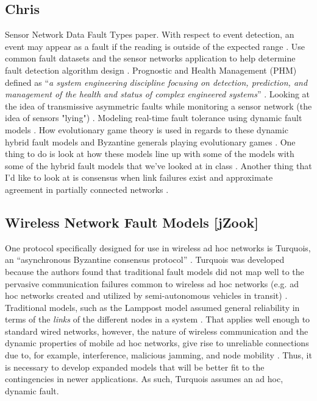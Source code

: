 \documentclass[twoside, conference]{IEEEtran}
\begin{document}
\subsection{Chris}
Sensor Network Data Fault Types paper\cite{Ni2009}.  With respect to event detection, an event may appear as a fault if the reading is outside of the expected range \cite[p. 25:5]{Ni2009}.  Use common fault datasets and the sensor networks application to help determine fault detection algorithm design \cite[p. 25:7]{Ni2009}.  Prognostic and Health Management (PHM) defined as ``\textit{a system engineering discipline focusing on detection, prediction, and management of the health and status of complex engineered systems}'' \cite[p. 1]{Ma2009}.  Looking at the idea of transmissive asymmetric faults while monitoring a sensor network (the idea of sensors "lying") \cite[p. 4]{Ma2009}.  Modeling real-time fault tolerance using dynamic fault models \cite[p. 4]{Ma2009}\cite{Ma2008}.  How evolutionary game theory is used in regards to these dynamic hybrid fault models \cite[p. 6]{Ma2009} and Byzantine generals playing evolutionary games \cite[p. 11,15]{Ma2009}.  One thing to do is look at how these models line up with some of the models with some of the hybrid fault models that we've looked at in class \cite{Azadmanesh2000}.  Another thing that I'd like to look at is consensus when link failures exist \cite{Biely2011} and approximate agreement in partially connected networks \cite{Srinivasan2007}.


\subsection{Wireless Network Fault Models [jZook]}


One protocol specifically designed for use in wireless ad hoc networks is Turquois, an ``asynchronous Byzantine consensus protocol'' \cite{Moniz2013}. Turquois was developed because the authors found that traditional fault models did not map well to the pervasive communication failures common to wireless ad hoc networks (e.g. ad hoc networks created and utilized by semi-autonomous vehicles in transit) \cite{Moniz2013}. Traditional models, such as the Lamppost model assumed general reliability in terms of the \textit{links} of the different nodes in a system \cite{Moniz2013}. That applies well enough to standard wired networks, however, the nature of wireless communication and the dynamic properties of mobile ad hoc networks, give rise to unreliable connections due to, for example, interference, malicious jamming, and node mobility \cite{Moniz2013}. Thus, it is necessary to develop expanded models that will be better fit to the contingencies in newer applications. As such, Turquois assumes an ad hoc, dynamic fault\cite{Moniz2013}.
\end{document}
